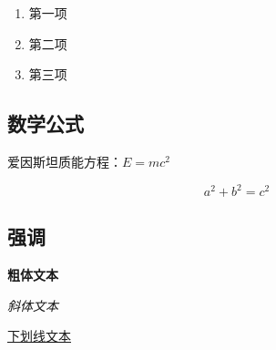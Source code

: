 \documentclass[UTF8]{ctexart}
\begin{document}
\begin{enumerate}
    \item 第一项
    \item 第二项
    \item 第三项
\end{enumerate}

\subsection{数学公式}

爱因斯坦质能方程：$E=mc^2$

\[
    a^2 + b^2 = c^2
\]

\subsection{强调}

\textbf{粗体文本}

\textit{斜体文本}

\underline{下划线文本}

\end{document}

